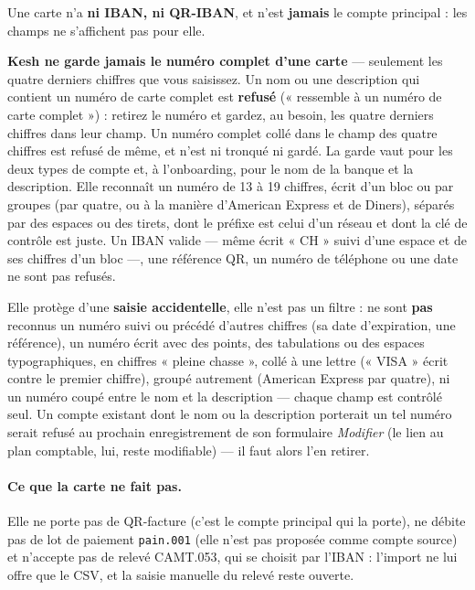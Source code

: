 \documentclass[a4paper,11pt,oneside]{article}
\begin{document}
Une carte n'a \textbf{ni IBAN, ni QR-IBAN}, et n'est \textbf{jamais} le compte principal : les champs ne s'affichent pas pour elle.

\begin{keshwarning}
\textbf{Kesh ne garde jamais le numéro complet d'une carte} --- seulement les quatre derniers chiffres que vous saisissez. Un nom ou une description qui contient un numéro de carte complet est \textbf{refusé} (« ressemble à un numéro de carte complet ») : retirez le numéro et gardez, au besoin, les quatre derniers chiffres dans leur champ. Un numéro complet collé dans le champ des quatre chiffres est refusé de même, et n'est ni tronqué ni gardé. La garde vaut pour les deux types de compte et, à l'onboarding, pour le nom de la banque et la description. Elle reconnaît un numéro de 13 à 19 chiffres, écrit d'un bloc ou par groupes (par quatre, ou à la manière d'American Express et de Diners), séparés par des espaces ou des tirets, dont le préfixe est celui d'un réseau et dont la clé de contrôle est juste. Un IBAN valide --- même écrit « CH » suivi d'une espace et de ses chiffres d'un bloc ---, une référence QR, un numéro de téléphone ou une date ne sont pas refusés.

Elle protège d'une \textbf{saisie accidentelle}, elle n'est pas un filtre : ne sont \textbf{pas} reconnus un numéro suivi ou précédé d'autres chiffres (sa date d'expiration, une référence), un numéro écrit avec des points, des tabulations ou des espaces typographiques, en chiffres « pleine chasse », collé à une lettre (« VISA » écrit contre le premier chiffre), groupé autrement (American Express par quatre), ni un numéro coupé entre le nom et la description --- chaque champ est contrôlé seul. Un compte existant dont le nom ou la description porterait un tel numéro serait refusé au prochain enregistrement de son formulaire \emph{Modifier} (le lien au plan comptable, lui, reste modifiable) --- il faut alors l'en retirer.
\end{keshwarning}

\paragraph{Ce que la carte ne fait pas.} Elle ne porte pas de QR-facture (c'est le compte principal qui la porte), ne débite pas de lot de paiement \texttt{pain.001} (elle n'est pas proposée comme compte source) et n'accepte pas de relevé CAMT.053, qui se choisit par l'IBAN : l'import ne lui offre que le CSV, et la saisie manuelle du relevé reste ouverte.
\end{document}
